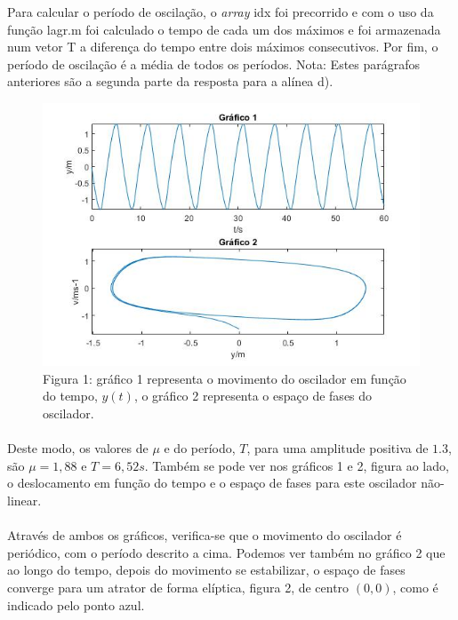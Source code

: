 \documentclass[a4paper, 11pt]{article}
\newcommand{\m}{$\mu$ }
\begin{document}
	Para calcular o período de oscilação, o \textit{array} {\selectfont idx} foi precorrido e com o uso da função {\selectfont lagr.m} foi calculado o tempo de cada um dos máximos e foi armazenada num vetor {\selectfont T} a diferença do tempo entre dois máximos consecutivos. Por fim, o período de oscilação é a média de todos os períodos.
	\newline
	{\footnotesize Nota: Estes parágrafos anteriores são a segunda parte da resposta para a alínea d).}
	\begin{figure}
		\centering
		\captionsetup{labelformat=empty}
		\includegraphics[scale=0.5]{parteA}
		\caption{\scriptsize Figura 1: gráfico 1 representa o movimento do oscilador em função do tempo, $y(t)$, o gráfico 2 representa o espaço de fases do oscilador.}
	\end{figure}
	\paragraph{}
	Deste modo, os valores de \m e do período, $T$, para uma amplitude positiva de $1.3$, são $\mu=1,88$ e $T=6,52s$. Também se pode ver nos gráficos 1 e 2, figura ao lado, o deslocamento em função do tempo e o espaço de fases para este oscilador não-linear.
	\paragraph{}
	Através de ambos os gráficos, verifica-se que o movimento do oscilador é periódico, com o período descrito a cima. Podemos ver também no gráfico 2 que ao longo do tempo, depois do movimento se estabilizar, o espaço de fases converge para um atrator de forma elíptica, figura 2, de centro $(0, 0)$, como é indicado pelo ponto azul.
\end{document}
